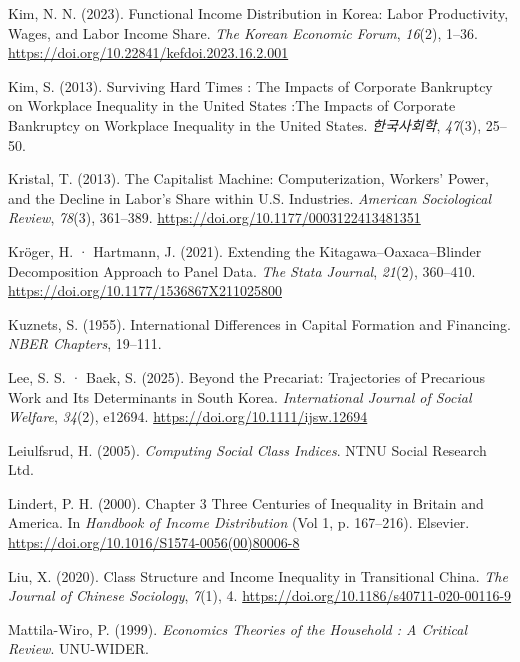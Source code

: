 \documentclass[
  letterpaper,
  DIV=11,
  numbers=noendperiod]{scrartcl}
\newlength{\cslhangindent}
\newenvironment{CSLReferences}[2] %
 {\begin{list}{}{%
  \setlength{\itemindent}{0pt}
  \setlength{\leftmargin}{0pt}
  \setlength{\parsep}{0pt}
  \ifodd #1
   \setlength{\leftmargin}{\cslhangindent}
   \setlength{\itemindent}{-1\cslhangindent}
  \fi
  \setlength{\itemsep}{#2\baselineskip}}}
 {\end{list}}
\begin{document}
\begin{CSLReferences}{1}{0}
Kim, N. N. (2023). {Functional Income Distribution in Korea: Labor
Productivity, Wages, and Labor Income Share}. \emph{The Korean Economic
Forum}, \emph{16}(2), 1--36.
\url{https://doi.org/10.22841/kefdoi.2023.16.2.001}

Kim, S. (2013). {Surviving Hard Times : The Impacts of Corporate
Bankruptcy on Workplace Inequality in the United States :The Impacts of
Corporate Bankruptcy on Workplace Inequality in the United States}.
\emph{한국사회학}, \emph{47}(3), 25--50.

Kristal, T. (2013). The {Capitalist Machine}: {Computerization},
{Workers}' {Power}, and the {Decline} in {Labor}'s {Share} within
{U}.{S}. {Industries}. \emph{American Sociological Review},
\emph{78}(3), 361--389. \url{https://doi.org/10.1177/0003122413481351}

Kröger, H. · Hartmann, J. (2021). Extending the
{Kitagawa}--{Oaxaca}--{Blinder} Decomposition Approach to Panel Data.
\emph{The Stata Journal}, \emph{21}(2), 360--410.
\url{https://doi.org/10.1177/1536867X211025800}

Kuznets, S. (1955). International {Differences} in {Capital Formation}
and {Financing}. \emph{NBER Chapters}, 19--111.

Lee, S. S. · Baek, S. (2025). Beyond the Precariat: {Trajectories} of
Precarious Work and Its Determinants in {South Korea}.
\emph{International Journal of Social Welfare}, \emph{34}(2), e12694.
\url{https://doi.org/10.1111/ijsw.12694}

Leiulfsrud, H. (2005). \emph{Computing {Social Class Indices}}. NTNU
Social Research Ltd.

Lindert, P. H. (2000). Chapter 3 {Three} Centuries of Inequality in
{Britain} and {America}. In \emph{Handbook of {Income Distribution}}
(Vol 1, p. 167--216). Elsevier.
\url{https://doi.org/10.1016/S1574-0056(00)80006-8}

Liu, X. (2020). Class Structure and Income Inequality in Transitional
{China}. \emph{The Journal of Chinese Sociology}, \emph{7}(1), 4.
\url{https://doi.org/10.1186/s40711-020-00116-9}

Mattila-Wiro, P. (1999). \emph{Economics {Theories} of the {Household} :
{A Critical Review}}. UNU-WIDER.


\end{CSLReferences}
\end{document}
